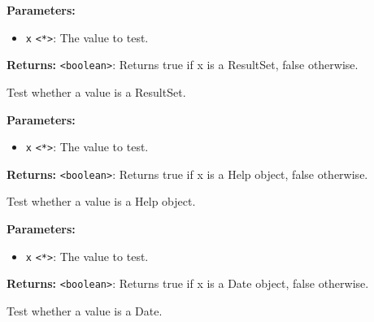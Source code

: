 \documentclass[12pt,a4paper]{article}
\begin{document}
\vspace{5mm}
\noindent {}


\noindent \textbf{Parameters:}
\begin{itemize}
  \item \texttt{x} \texttt{<*>}: The value to test.
\end{itemize}

\noindent \textbf{Returns:} \texttt{<boolean>}: Returns true if \textasciigrave{}x\textasciigrave{} is a ResultSet, false otherwise.

\noindent Test whether a value is a ResultSet.

\vspace{5mm}
\noindent {}


\noindent \textbf{Parameters:}
\begin{itemize}
  \item \texttt{x} \texttt{<*>}: The value to test.
\end{itemize}

\noindent \textbf{Returns:} \texttt{<boolean>}: Returns true if \textasciigrave{}x\textasciigrave{} is a Help object, false otherwise.

\noindent Test whether a value is a Help object.

\vspace{5mm}
\noindent {}


\noindent \textbf{Parameters:}
\begin{itemize}
  \item \texttt{x} \texttt{<*>}: The value to test.
\end{itemize}

\noindent \textbf{Returns:} \texttt{<boolean>}: Returns true if \textasciigrave{}x\textasciigrave{} is a Date object, false otherwise.

\noindent Test whether a value is a Date.

\vspace{5mm}
\noindent {}
\end{document}
